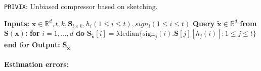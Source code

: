 \begin{algorithm}[H]
\caption{\texttt{PRIVIX}\cite{li2019privacy}: Unbiased compressor based on sketching. }\label{Alg:csketch}
\begin{algorithmic}[1]
\State \textbf{Inputs:} $\boldsymbol{x}\in\mathbb{R}^{d}, t, k, \mathbf{S}_{t\times k}, h_i (1\leq i\leq t), sign_i (1\leq i\leq t)$
\State \textbf{Query} $\tilde{\boldsymbol{x}}\in\mathbb{R}^d$ \textbf{from $\mathbf{S(\boldsymbol{x})}$:}
\State \textbf{for} $i=1,\ldots,d$ \textbf{do}
\State \quad\quad $\mathbf{S}_{\tilde{\boldsymbol{x}}}[i]=\text{Median}\{\text{sign}_j(i).\mathbf{S}[j][h_j(i)]:1\leq j\leq t\}$ 
\State \textbf{end for}
\State \textbf{Output:} $\mathbf{S}_{\tilde{\boldsymbol{x}}}$
\vspace{- 0.1cm}
\end{algorithmic}
\end{algorithm}
\paragraph{Estimation errors:}

